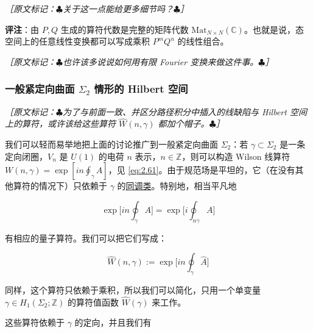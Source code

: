 {\small\itshape ［原文标记：$\clubsuit$关于这一点能给更多细节吗？$\clubsuit$］}

\textbf{评注}：由 $P,Q$ 生成的算符代数是完整的矩阵代数 $\mathrm{Mat}_{N\times N}(\mathbb{C})$。也就是说，态空间上的任意线性变换都可以写成乘积 $P^mQ^n$ 的线性组合。

{\small\itshape ［原文标记：$\clubsuit$也许该多说说如何用有限 Fourier 变换来做这件事。$\clubsuit$］}

\subsubsection*{一般紧定向曲面 $\Sigma_2$ 情形的 Hilbert 空间} %

{\small\itshape ［原文标记：$\clubsuit$为了与前面一致、并区分路径积分中插入的线缺陷与 Hilbert 空间上的算符，或许该给这些算符 $\widehat{W}(n,\gamma)$ 都加个帽子。$\clubsuit$］}

我们可以轻而易举地把上面的讨论推广到一般紧定向曲面 $\Sigma_2$：若 $\gamma\subset\Sigma_2$ 是一条定向闭圈，$V_n$ 是 $U(1)$ 的电荷 $n$ 表示，$n\in\mathbb{Z}$，则可以构造 Wilson 线算符 $W(n,\gamma)=\exp[in\oint_\gamma A]$，见 \eqref{eq:2.61}。由于规范场是平坦的，它（在没有其他算符的情况下）只依赖于 $\gamma$ 的\underline{同调类}。特别地，相当平凡地

\begin{equation}
  \exp\Big[in\oint_\gamma A\Big]=\exp\Big[i\oint_{n\gamma}A\Big]
  \tag{2.211}
  \label{eq:2.211}
\end{equation}

有相应的量子算符。我们可以把它们写成：

\begin{equation}
  \widehat{W}(n,\gamma):=\exp\Big[in\oint_\gamma\widehat{A}\Big]
  \tag{2.212}
  \label{eq:2.212}
\end{equation}

同样，这个算符只依赖于乘积，所以我们可以简化，只用一个单变量 $\gamma\in H_1(\Sigma_2;\mathbb{Z})$ 的算符值函数 $\widehat{W}(\gamma)$ 来工作。

这些算符依赖于 $\gamma$ 的定向，并且我们有

